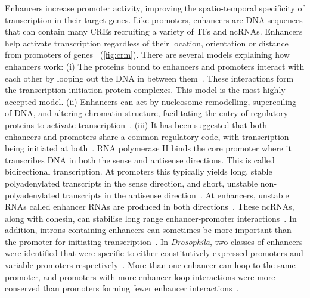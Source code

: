 Enhancers increase promoter activity, improving the spatio\hyp{}temporal
specificity of transcription in their target genes. Like promoters,
enhancers are DNA sequences that can contain many CREs recruiting a
variety of TFs and ncRNAs. Enhancers help activate transcription
regardless of their location, orientation or distance from promoters of
genes~\autocite{banerjiExpressionBetaglobinGene1981} (\autoref{fig:crm}). There
are several models explaining how enhancers work: (i) The proteins bound
to enhancers and promoters interact with each other by looping out the
DNA in between them~\autocite{carterLongrangeChromatinRegulatory2002,tolhuisLoopingInteractionHypersensitive2002,vilarDNALoopingGene2005,delaatChapterThreeDimensional2008,amanoChromosomalDynamicsShh2009}.
These interactions form the
transcription initiation protein complexes. This model is the most
highly accepted model. (ii) Enhancers can act by nucleosome remodelling,
supercoiling of DNA, and altering chromatin structure, facilitating the
entry of regulatory proteins to activate transcription~\autocite{corlessEffectsDNASupercoiling2016}. (iii) It has been suggested that both enhancers and
promoters share a common regulatory code, with transcription being
initiated at both~\autocite{coreNascentRNASequencing2008,engreitzLocalRegulationGene2016}. RNA polymerase II binds the core
promoter where it transcribes DNA in both the sense and antisense
directions. This is called bidirectional transcription. At promoters
this typically yields long, stable polyadenylated transcripts in the
sense direction, and short, unstable non\hyp{}polyadenylated transcripts in
the antisense direction~\autocite{anderssonPromoterEnhancerWhat2015}. At enhancers, unstable RNAs
called enhancer RNAs are produced in both directions~\autocite{dingEnhancerRNAsERNAs2018}.
These ncRNAs, along with cohesin, can stabilise long range
enhancer\hyp{}promoter interactions~\autocite{oromLongNoncodingRNAs2010}. In addition, introns
containing enhancers can sometimes be more important than the promoter
for initiating transcription~\autocite{gallegosIntronDNASequences2017}. In \textit{Drosophila}, two
classes of enhancers were identified that were specific to either
constitutively expressed promoters and variable promoters respectively~\autocite{zabidiEnhancerCorepromoterSpecificity2015}.
More than one enhancer can loop to the same promoter, and promoters with more enhancer loop interactions were more conserved than promoters forming fewer enhancer interactions~\autocite{dankoDynamicEvolutionRegulatory2018a}.

